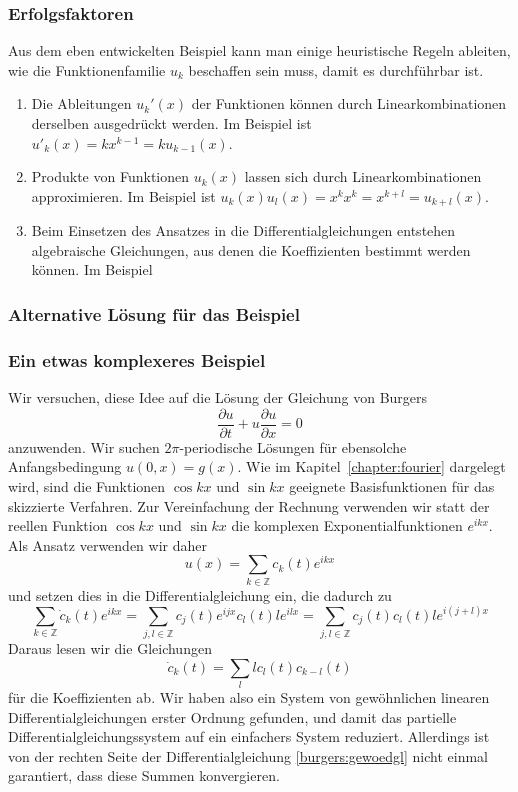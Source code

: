 \subsubsection{Erfolgsfaktoren}
Aus dem eben entwickelten Beispiel kann man einige heuristische Regeln ableiten,
wie die Funktionenfamilie $u_k$ beschaffen sein muss, damit es
durchführbar ist.
\begin{enumerate}
\item Die Ableitungen $u_k'(x)$ der Funktionen können durch
Linearkombinationen derselben ausgedrückt werden.
Im Beispiel ist $u'_k(x)=kx^{k-1}=ku_{k-1}(x)$.
\item Produkte von Funktionen $u_k(x)$ lassen sich durch Linearkombinationen
approximieren.
Im Beispiel ist $u_k(x)u_l(x)=x^kx^k = x^{k+l}=u_{k+l}(x)$.
\item Beim Einsetzen des Ansatzes in die Differentialgleichungen
entstehen algebraische Gleichungen, aus denen die Koeffizienten
bestimmt werden können.
Im Beispiel 
\end{enumerate}

\subsubsection{Alternative Lösung für das Beispiel}

\subsubsection{Ein etwas komplexeres Beispiel}
Wir versuchen, diese Idee auf die Lösung der Gleichung von
Burgers
\[
\frac{\partial u}{\partial t} + u\frac{\partial u}{\partial x}=0
\]
anzuwenden.
Wir suchen $2\pi$-periodische Lösungen für ebensolche Anfangsbedingung
$u(0,x)=g(x)$.
Wie im Kapitel~\ref{chapter:fourier} dargelegt wird, sind die Funktionen
$\cos kx$ und $\sin kx$ geeignete Basisfunktionen für das skizzierte Verfahren.
Zur Vereinfachung der Rechnung verwenden wir statt der reellen Funktion
$\cos kx$ und $\sin kx$ die komplexen Exponentialfunktionen $e^{ikx}$.
Als Ansatz verwenden wir daher
\[
u(x) = \sum_{k\in\mathbb Z} c_k(t) e^{ikx}
\]
und setzen dies in die Differentialgleichung ein, die dadurch zu
\[
\sum_{k\in\mathbb Z} \dot c_k(t) e^{ikx}
=
\sum_{j,l\in\mathbb Z} c_j(t)e^{ijx} c_l(t) le^{ilx}
=
\sum_{j,l\in\mathbb Z} c_j(t)c_l(t) le^{i(j+l)x}
\]
Daraus lesen wir die Gleichungen
\begin{equation}
\dot c_k(t) = \sum_{l} lc_l(t)c_{k-l}(t)
\label{burgers:gewoedgl}
\end{equation}
für die Koeffizienten ab.
Wir haben also ein System von gewöhnlichen linearen Differentialgleichungen
erster Ordnung gefunden, und damit das partielle Differentialgleichungssystem
auf ein einfachers System reduziert.
Allerdings ist von der rechten Seite der Differentialgleichung
\eqref{burgers:gewoedgl}
nicht einmal garantiert, dass diese Summen konvergieren.

